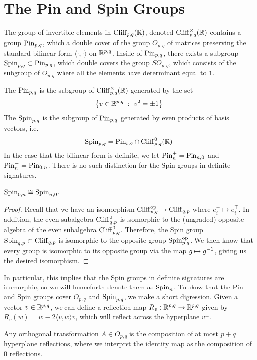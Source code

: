 %
\section{The Pin and Spin Groups}
%
The group of invertible elements in $\operatorname{Cliff}_{p,q}(\mathbb{R})$, denoted
$\operatorname{Cliff}_{p,q}^\times(\mathbb{R})$ contains a group $\mathrm{Pin}_{p,q}$, which a double
cover of the group $O_{p,q}$ of matrices preserving the standard bilinear
form $\langle \cdot,\cdot \rangle$ on $\mathbb{R}^{p,q}$. Inside of $\mathrm{Pin}_{p,q}$,
there exists a subgroup $\mathrm{Spin}_{p,q} \subset \mathrm{Pin}_{p,q}$, which double covers
the group $SO_{p,q}$, which consists of the subgroup of $O_{p,q}$ where
all the elements have determinant equal to $1$.
%
\begin{defn}
The  $\mathrm{Pin}_{p,q}$ is the subgroup of $\operatorname{Cliff}_{p,q}^\times(\mathbb{R})$
generated by the set
\[
\left\lbrace v \in \mathbb{R}^{p,q} ~:~ v^2 = \pm 1 \right\rbrace
\]
The  $\mathrm{Spin}_{p,q}$ is the subgroup of $\mathrm{Pin}_{p,q}$ generated by even
products of basis vectors, i.e.
\[
\mathrm{Spin}_{p,q} = \mathrm{Pin}_{p,q} \cap \operatorname{Cliff}_{p,q}^0(\mathbb{R})
\]
In the case that the bilinear form is definite, we let $\mathrm{Pin}_n^+ = \mathrm{Pin}_{n,0}$
and $\mathrm{Pin}_n^- = \mathrm{Pin}_{0,n}$. There is no such distinction for the Spin groups
in definite signatures.
\end{defn}
%
\begin{thm}
$\mathrm{Spin}_{0,n} \cong \mathrm{Spin}_{n,0}$.
\end{thm}
%
\begin{proof}
Recall that we have an isomorphism $\operatorname{Cliff}_{p,q}^{\text{op}} \to \operatorname{Cliff}_{q,p}$
where $e_i^\pm \mapsto e_i^\mp$. In addition, the even subalgebra $\operatorname{Cliff}_{q,p}^0$
is isomorphic to the (ungraded) opposite algebra of the even subalgebra
$\operatorname{Cliff}_{p,q}^0$. Therefore, the Spin group $\mathrm{Spin}_{q,p} \subset \operatorname{Cliff}_{q,p}$
is isomorphic to the opposite group $\mathrm{Spin}_{p,q}^\text{op}$. We then know
that every group is isomorphic to its opposite group via the map $g \mapsto g^{-1}$,
giving us the desired isomorphism.
\end{proof}
%
In particular, this implies that the Spin groups in definite signatures are
isomorphic, so we will henceforth denote them as $\mathrm{Spin}_n$.
%
To show that the Pin and Spin groups cover $O_{p,q}$ and $\mathrm{Spin}_{p,q}$, we make
a short digression. Given a vector $v \in \mathbb{R}^{p,q}$, we can define a reflection
map $R_v : \mathbb{R}^{p,q} \to \mathbb{R}^{p,q}$ given by $R_v(w) = w - 2\langle v,w \rangle v$,
which will reflect across the hyperplane $v^\perp$.
%
\begin{thm}
Any orthogonal transformation $A \in O_{p,q}$ is the composition
of at most $p+q$ hyperplane reflections, where we interpret the identity map as the
composition of $0$ reflections.
\end{thm}
